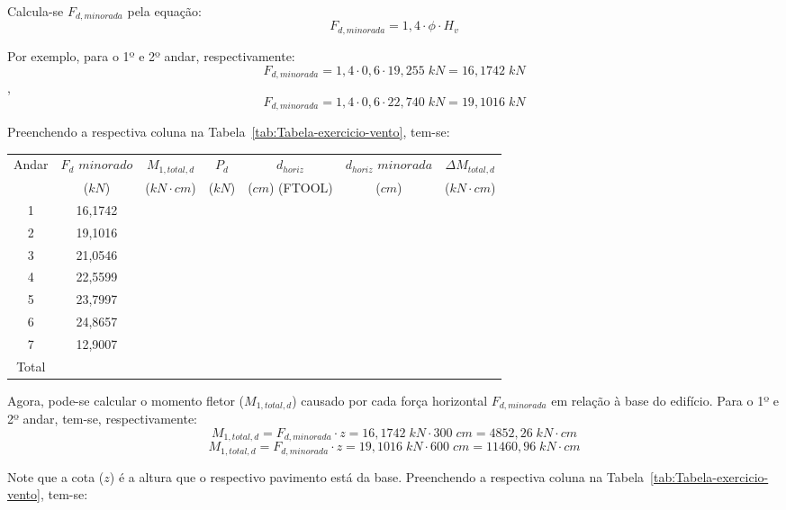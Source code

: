 Calcula-se $F_{d, minorada}$ pela equação: $$F_{d, minorada}=1,4\cdot\phi\cdot H_v$$

Por exemplo, para o 1º e 2º andar, respectivamente: $$F_{d, minorada}=1,4\cdot 0,6\cdot 19,255\;kN=16,1742\;kN$$, $$F_{d, minorada}=1,4\cdot 0,6\cdot 22,740\;kN=19,1016\;kN$$

Preenchendo a respectiva coluna na Tabela~\ref{tab:Tabela-exercicio-vento}, tem-se:

\begin{table}[H]
\centering
\begin{tabular}{c|c|c|ccc|c}
\hline
Andar & $F_d$ $minorado$ & $M_{1, total, d}$ & \multicolumn{1}{c|}{$P_d$} & \multicolumn{1}{c|}{$d_{horiz}$} & $d_{horiz}$ $minorada$ & $\Delta M_{total, d}$ \\
 & ($kN$) & ($kN\cdot cm$) & \multicolumn{1}{c|}{($kN$)} & \multicolumn{1}{c|}{($cm$) (FTOOL)} & ($cm$) & ($kN\cdot cm$) \\ \hline
1 & 16,1742 &  & \multicolumn{1}{c|}{} & \multicolumn{1}{c|}{} &  &  \\
2 & 19,1016 &  & \multicolumn{1}{c|}{} & \multicolumn{1}{c|}{} &  &  \\
3 & 21,0546 &  & \multicolumn{1}{c|}{} & \multicolumn{1}{c|}{} &  &  \\
4 & 22,5599 &  & \multicolumn{1}{c|}{} & \multicolumn{1}{c|}{} &  &  \\
5 & 23,7997 &  & \multicolumn{1}{c|}{} & \multicolumn{1}{c|}{} &  &  \\
6 & 24,8657 &  & \multicolumn{1}{c|}{} & \multicolumn{1}{c|}{} &  &  \\
7 & 12,9007 &  & \multicolumn{1}{c|}{} & \multicolumn{1}{c|}{} &  &  \\ \hline
Total &  &  &  &  &  &  \\ \cline{1-1} \cline{3-3} \cline{7-7} 
\end{tabular}
\end{table}

Agora, pode-se calcular o momento fletor ($M_{1, total, d}$) causado por cada força horizontal $F_{d, minorada}$ em relação à base do edifício. Para o 1º e 2º andar, tem-se, respectivamente:
$$M_{1, total, d}=F_{d, minorada}\cdot z=16,1742\;kN\cdot 300\;cm=4852,26\;kN\cdot cm$$
$$M_{1, total, d}=F_{d, minorada}\cdot z=19,1016\;kN\cdot 600\;cm=11460,96\;kN\cdot cm$$

Note que a cota ($z$) é a altura que o respectivo pavimento está da base. Preenchendo a respectiva coluna na Tabela~\ref{tab:Tabela-exercicio-vento}, tem-se:

